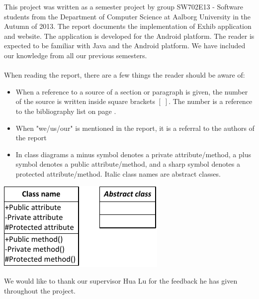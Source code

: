 This project was written as a semester project by group SW702E13 - Software students from the Department of Computer Science at Aalborg University in the Autumn of 2013. The report documents the implementation of Exhib application and website. The application is developed for the Android platform. The reader is expected to be familiar with Java and the Android platform. We have included our knowledge from all our previous semesters.
\\\\
When reading the report, there are a few things the reader should be aware of:
\begin{itemize}
\item When a reference to a source of a section or paragraph is given, the number of the source is written inside square brackets $[\;]$. The number is a reference to the bibliography list on page \pageref{chap:bib}.
\item When "we/us/our" is mentioned in the report, it is a referral to the authors of the report
\item In class diagrams a minus symbol denotes a private attribute/method, a plus symbol denotes a public attribute/method, and a sharp symbol denotes a protected attribute/method. Italic class names are abstract classes.
\end{itemize}
\begin{center}
\includegraphics[width=0.35\linewidth]{img/umltheory.pdf}
\end{center}
We would like to thank our supervisor Hua Lu for the feedback he has given throughout the project.
